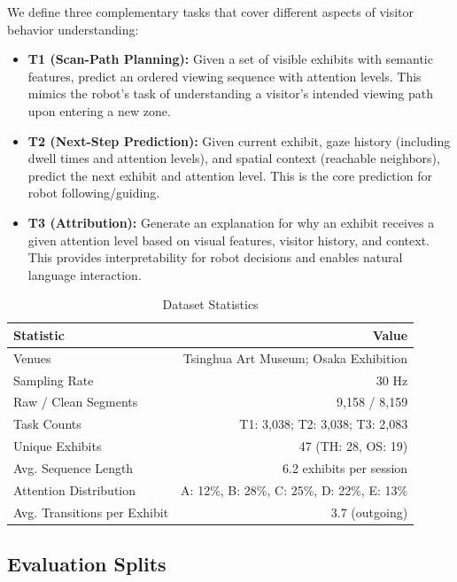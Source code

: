 \documentclass[letterpaper]{article}
\begin{document}
We define three complementary tasks that cover different aspects of visitor behavior understanding:

\begin{itemize}
    \item \textbf{T1 (Scan-Path Planning):} Given a set of visible exhibits with semantic features, predict an ordered viewing sequence with attention levels. This mimics the robot's task of understanding a visitor's intended viewing path upon entering a new zone.

    \item \textbf{T2 (Next-Step Prediction):} Given current exhibit, gaze history (including dwell times and attention levels), and spatial context (reachable neighbors), predict the next exhibit and attention level. This is the core prediction for robot following/guiding.

    \item \textbf{T3 (Attribution):} Generate an explanation for why an exhibit receives a given attention level based on visual features, visitor history, and context. This provides interpretability for robot decisions and enables natural language interaction.
\end{itemize}

\begin{table}[h]
\centering
\caption{Dataset Statistics}
\begin{tabular}{lr}
\toprule
Statistic & Value \\
\midrule
Venues & Tsinghua Art Museum; Osaka Exhibition \\
Sampling Rate & 30 Hz \\
Raw / Clean Segments & 9,158 / 8,159 \\
Task Counts & T1: 3,038; T2: 3,038; T3: 2,083 \\
Unique Exhibits & 47 (TH: 28, OS: 19) \\
Avg. Sequence Length & 6.2 exhibits per session \\
Attention Distribution & A: 12\%, B: 28\%, C: 25\%, D: 22\%, E: 13\% \\
Avg. Transitions per Exhibit & 3.7 (outgoing) \\
\bottomrule
\end{tabular}
\label{tab:dataset}
\end{table}

\subsection{Evaluation Splits}
\end{document}

